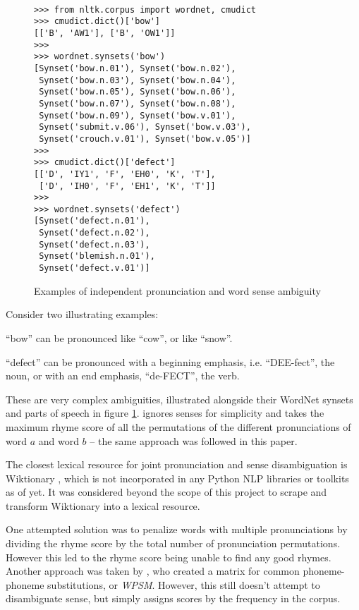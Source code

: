 \documentclass[11pt,a4paper]{article}
\newenvironment{tight_enumerate}{
\begin{enumerate}
\setlength{\itemsep}{0pt}
\setlength{\parskip}{0pt}
}{\end{enumerate}}
\begin{document}
\begin{figure}
\begin{Verbatim}[fontsize=\small]

>>> from nltk.corpus import wordnet, cmudict
>>> cmudict.dict()['bow']
[['B', 'AW1'], ['B', 'OW1']]
>>>
>>> wordnet.synsets('bow')
[Synset('bow.n.01'), Synset('bow.n.02'),
 Synset('bow.n.03'), Synset('bow.n.04'),
 Synset('bow.n.05'), Synset('bow.n.06'),
 Synset('bow.n.07'), Synset('bow.n.08'),
 Synset('bow.n.09'), Synset('bow.v.01'),
 Synset('submit.v.06'), Synset('bow.v.03'),
 Synset('crouch.v.01'), Synset('bow.v.05')]
>>>
>>> cmudict.dict()['defect']
[['D', 'IY1', 'F', 'EH0', 'K', 'T'],
 ['D', 'IH0', 'F', 'EH1', 'K', 'T']]
>>>
>>> wordnet.synsets('defect')
[Synset('defect.n.01'),
 Synset('defect.n.02'),
 Synset('defect.n.03'),
 Synset('blemish.n.01'),
 Synset('defect.v.01')]
\end{Verbatim}
\caption{Examples of independent pronunciation and word sense ambiguity}
\label{fig:wordnet}
\end{figure}

Consider two illustrating examples:
\begin{tight_enumerate}
	\vspace{-0.5em}
	\item
		``bow'' can be pronounced like ``cow'', or like ``snow''.
	\item
		``defect'' can be pronounced with a beginning emphasis, i.e. ``DEE-fect'', the noun, or with an end emphasis, ``de-FECT'', the verb.
\end{tight_enumerate}

These are very complex ambiguities, illustrated alongside their WordNet synsets and parts of speech in figure \ref{fig:wordnet}. \citet{keswarani} ignores senses for simplicity and takes the maximum rhyme score of all the permutations of the different pronunciations of word $a$ and word $b$ -- the same approach was followed in this paper.

The closest lexical resource for joint pronunciation and sense disambiguation is Wiktionary \cite{wiktionary}, which is not incorporated in any Python NLP libraries or toolkits as of yet. It was considered beyond the scope of this project to scrape and transform Wiktionary into a lexical resource.

One attempted solution was to penalize words with multiple pronunciations by dividing the rhyme score by the total number of pronunciation permutations. However this led to the rhyme score being unable to find any good rhymes. Another approach was taken by \citet{hixon}, who created a matrix for common phoneme-phoneme substitutions, or \textit{WPSM}. However, this still doesn't attempt to disambiguate sense, but simply assigns scores by the frequency in the corpus.
\end{document}
